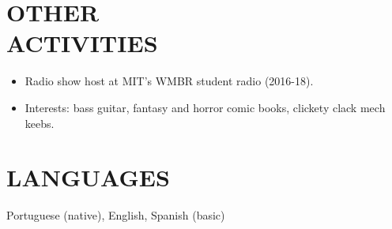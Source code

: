 \documentclass[line,margin]{res}
\begin{document}
\begin{resume}
\section{OTHER \\ ACTIVITIES}
  \begin{itemize}  \itemsep -2pt
  \item Radio show host at MIT's WMBR student radio (2016-18).
  \item Interests: bass guitar, fantasy and horror comic books, clickety clack mech keebs.
  \end{itemize}

\section{LANGUAGES}
Portuguese (native), English, Spanish (basic)

\end{resume}
\end{document}
